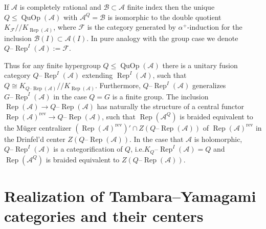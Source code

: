 \documentclass[twoside,11pt,reqno]{amsart}
\makeatletter
\theoremstyle{definition}
\theoremstyle{remark}
\newcommand{\cF}{\mathcal{F}}
\newcommand{\cB}{\mathcal{B}}
\newcommand{\A}{\mathcal{A}}
\DeclareMathOperator{\Rep}{Rep}
\DeclareRobustCommand{\ie}{i.e.\@\xspace}
\DeclareMathOperator{\QuOp}{QuOp}
\newcommand{\tRep}[1]{#1\text{--}\Rep}
\newcommand{\CS}{/\!/}
\newcommand{\rev}[1]{{#1}^\mathrm{rev}}
\makeatother
\begin{document}
If $\A$ is completely rational and $\cB\subset \A$ finite index
then the unique $Q\leq \QuOp(\A)$ with $\A^Q=\cB$  is isomorphic to
the double quotient $K_\cF\CS K_{\Rep(\A)}$, 
where $\cF$ is the category generated by
$\alpha^+$-induction for the inclusion $\cB(I)\subset \A(I)$.
In pure analogy with the group case we denote $\tRep{ Q}^I(\A):=\cF$.

Thus for any finite hypergroup $Q\leq \QuOp(\A)$ there is a unitary fusion 
category $\tRep {Q}^I(\A)$ extending $\Rep^I(\A)$, such that 
$Q\cong  K_{\tRep Q(\A)}\CS K_{\Rep(\A)}$. 
Furthermore, $\tRep {Q}^I(\A)$ generalizes  
$\tRep {G}^I(\A)$  in the case $Q=G$ is a finite group.
The inclusion $\Rep(\A)\to \tRep Q(\A)$ has naturally the 
structure of a central functor 
$\rev{\Rep(\A)}\to \tRep Q(\A)$, such that  
$\Rep(\A^Q)$ is braided equivalent to the M\"uger centralizer
$(\rev{\Rep(\A)})'\cap Z(\tRep Q(\A))$
of $\rev{\Rep(\A)}$ in the Drinfel'd center $Z(\tRep Q(\A))$.
In the case that $\A$ is holomorphic, $\tRep{Q}^I(\A)$ is a categorification 
of $Q$, \ie $K_\tRep{Q}^I(\A)=Q$ and $\Rep(\A^Q)$ is braided equivalent to
$Z(\tRep Q(\A))$.



\section{Realization of Tambara--Yamagami categories and their centers}
\end{document}
